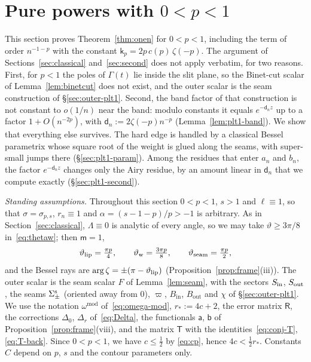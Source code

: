 
\section{\texorpdfstring{Pure powers with $0<p<1$}{Pure powers with 0<p<1}}\label{sec:plt1}

This section proves Theorem~\ref{thm:onen} for $0<p<1$, including the term of order $n^{-1-p}$ with the constant
$\mathsf k_p=2p\,c(p)\,\zeta(-p)$. The argument of Sections~\ref{sec:classical} and~\ref{sec:second} does not apply
verbatim, for two reasons. First, for $p<1$ the poles of $\Gamma(t)$ lie inside the slit plane, so the Binet-cut scalar
of Lemma~\ref{lem:binetcut} does not exist, and the outer scalar is the seam construction of \S\ref{sec:outer-plt1}.
Second, the band factor of that construction is not constant to $o(1/n)$ near the band: modulo constants it equals
$e^{-\mathsf d_nz}$ up to a factor $1+O(n^{-2p})$, with $\mathsf d_n:=2\zeta(-p)n^{-p}$ (Lemma~\ref{lem:plt1-band}). We show that
everything else survives. The hard edge is handled by a classical Bessel parametrix whose square root of the weight is
glued along the seams, with super-small jumps there (\S\ref{sec:plt1-param}). Among the residues that enter $a_n$ and
$b_n$, the factor $e^{-\mathsf d_nz}$ changes only the Airy residue, by an amount linear in $\mathsf d_n$ that we compute
exactly (\S\ref{sec:plt1-second}).

\emph{Standing assumptions.} Throughout this section $0<p<1$, $s>1$ and $\ell\equiv1$, so that $\sigma=\sigma_{p,s}$,
$r_n\equiv1$ and $\alpha=(s-1-p)/p>-1$ is arbitrary. As in Section~\ref{sec:classical}, $\Lambda\equiv0$ is analytic of
every angle, so we may take $\vartheta\ge3\pi/8$ in~\eqref{eq:thetaw}; then $\mathsf m=1$,
\[
  \vartheta_{\mathrm{lip}}=\tfrac{\pi p}4,\qquad\vartheta_{\mathrm{w}}=\tfrac{3\pi p}8,\qquad\vartheta_{\mathrm{seam}}=\tfrac{\pi p}2,
\]
and the Bessel rays are $\arg\zeta=\pm(\pi-\vartheta_{\mathrm{lip}})$ (Proposition~\ref{prop:frame}(iii)). The outer scalar is the seam
scalar $F$ of Lemma~\ref{lem:seam}, with the sectors $S_{\mathrm{in}}$, $S_{\mathrm{out}}$, the seams $\Sigma^{\mathrm{s}}_\pm$ (oriented away from $0$),
$\varpi$, $B_{\mathrm{in}}$, $B_{\mathrm{out}}$ and $\chi$ of \S\ref{sec:outer-plt1}. We use the notation
$\omega^{\mathrm{mod}}$ of~\eqref{eq:omega-mod}, $r_*:=4c+2$, the error matrix $\mathsf R$, the corrections $\Delta_0$,
$\Delta_r$ of~\eqref{eq:Delta}, the functionals $\mathsf a$, $\mathsf b$ of Proposition~\ref{prop:frame}(viii), and the
matrix $\mathsf T$ with the identities~\eqref{eq:conj-T}, \eqref{eq:T-back}. Since $0<p<1$, we have $c\le\frac12$ by
\eqref{eq:cp}, hence $4c<\frac12r_*$. Constants $C$ depend on $p$, $s$ and the contour parameters only.

